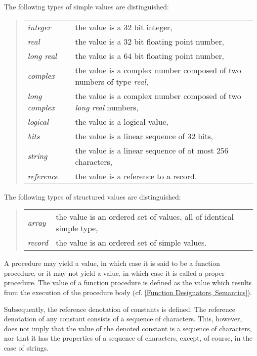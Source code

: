 \documentclass[a4paper]{article}
\def\IndexType#1{}
\def\T#1{\textit{#1}}
\def\Ti#1{\IndexType{#1}\T{#1}}
\begin{document}
 The following types of simple values are distinguished:
\begin{quote}
\begin{tabular}[t]{lp{3.5in}}
\Ti{integer}      & the value is a 32 bit integer, \\
\Ti{real}         & the value is a 32 bit floating point number, \\
\Ti{long real}    & the value is a 64 bit floating point number, \\
\Ti{complex}      & the value is a complex number composed of two numbers of type \T{real}, \\
\Ti{long complex} & the value is a complex number composed of two \T{long real} numbers, \\
\Ti{logical}      & the value is a logical value, \\
\Ti{bits}         & the value is a linear sequence of 32 bits, \\
\Ti{string}       & the value is a linear sequence of at most 256 characters, \\
\Ti{reference}    & the value is a reference to a record.
\end{tabular}
\end{quote}

The following types of structured values are distinguished:
\begin{quote}
\begin{tabular}[t]{lp{3.5in}}
  \Ti{array}  & the value is an ordered set of values, all of identical simple type, \\
  \Ti{record} & the value is an ordered set of simple values.
\end{tabular}
\end{quote}

A procedure may yield a value, in which case it is said to be a
function procedure, or it may not yield a value, in which case it is
called a proper procedure. The value of a function procedure is
defined as the value which results from the execution of the procedure
body (cf. \ref{Function Designators, Semantics}).

Subsequently, the reference denotation of constants is defined.  The
reference denotation of any constant consists of a sequence of
characters.  This, however, does not imply that the value of the
denoted constant is a sequence of characters, nor that it has the
properties of a sequence of characters, except, of course, in the case
of strings.

\newpage
\end{document}
